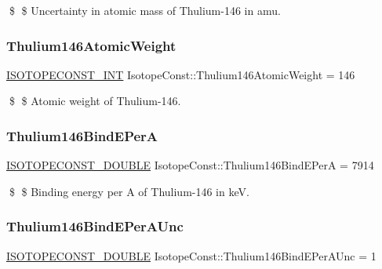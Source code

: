 \$ \$ Uncertainty in atomic mass of Thulium-\/146 in amu. \mbox{\label{group___isotope_const-_thulium-_tm146_gaa2578d1b8b3dc8127ddcd6b764ef05e0}} 
\subsubsection{\texorpdfstring{Thulium146\+Atomic\+Weight}{Thulium146AtomicWeight}}
{\footnotesize\ttfamily \mbox{\hyperlink{group___isotope_const-_macros_ga5f18360b3e99483a35c32d789e62621c}{I\+S\+O\+T\+O\+P\+E\+C\+O\+N\+S\+T\+\_\+\+I\+NT}} Isotope\+Const\+::\+Thulium146\+Atomic\+Weight = 146}

\$ \$ Atomic weight of Thulium-\/146. \mbox{\label{group___isotope_const-_thulium-_tm146_ga3c63cbcc9f6baac5f2202ec374e8b158}} 
\subsubsection{\texorpdfstring{Thulium146\+Bind\+E\+PerA}{Thulium146BindEPerA}}
{\footnotesize\ttfamily \mbox{\hyperlink{group___isotope_const-_macros_ga8f45a7272ce02c0b4c65c44636ed719a}{I\+S\+O\+T\+O\+P\+E\+C\+O\+N\+S\+T\+\_\+\+D\+O\+U\+B\+LE}} Isotope\+Const\+::\+Thulium146\+Bind\+E\+PerA = 7914}

\$ \$ Binding energy per A of Thulium-\/146 in keV. \mbox{\label{group___isotope_const-_thulium-_tm146_ga885913b8aa37e52e4080fbaff78c18d4}} 
\subsubsection{\texorpdfstring{Thulium146\+Bind\+E\+Per\+A\+Unc}{Thulium146BindEPerAUnc}}
{\footnotesize\ttfamily \mbox{\hyperlink{group___isotope_const-_macros_ga8f45a7272ce02c0b4c65c44636ed719a}{I\+S\+O\+T\+O\+P\+E\+C\+O\+N\+S\+T\+\_\+\+D\+O\+U\+B\+LE}} Isotope\+Const\+::\+Thulium146\+Bind\+E\+Per\+A\+Unc = 1}

